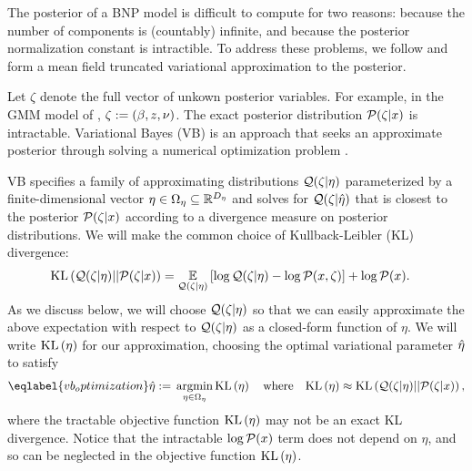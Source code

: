 The posterior of a BNP model is difficult to compute for two reasons: because
the number of components is (countably) infinite, and because the posterior
normalization constant is intractible.  To address these problems, we follow
\citet{blei:2006:vi_for_dp} and form a mean field truncated variational
approximation to the posterior.

Let $\zeta$ denote the full vector of unkown posterior variables. For example,
in the GMM model of , $\zeta := (\beta, z, \nu)$.  The
exact posterior distribution $\mathcal{P}(\zeta \vert x)$ is intractable. Variational
Bayes (VB) is an approach that seeks an approximate posterior through solving a
numerical optimization problem \citep{jordan:1999:vi,
wainwright:2008:graphical_models, blei:2017:vi_review}.

VB specifies a family of approximating distributions $\mathcal{Q}(\zeta \vert \eta)$
parameterized by a finite-dimensional vector $\eta \in \Omega_{\eta} \subseteq
\mathbb{R}^{{D_{\eta}}}$ and solves for $\mathcal{Q}(\zeta\vert\hat\eta)$ that is closest to
the posterior $\mathcal{P}(\zeta \vert x)$ according to a divergence measure on
posterior distributions. We will make the common choice of Kullback-Leibler (KL)
divergence:
%
\begin{align*}
%
\KL{\q(\zeta \vert \eta) || \p(\zeta \vert \x)}
={}&    \expect{\q(\zeta \vert \eta)}{
        \log \q(\zeta \vert \eta) - \logp(\x, \zeta)} + \logp(\x). \nonumber
%
\end{align*}
%
As we discuss below, we will choose $\mathcal{Q}(\zeta \vert \eta)$ so that we can easily
approximate the above expectation with respect to $\mathcal{Q}(\zeta \vert \eta)$ as a
closed-form function of $\eta$.  We will write $\mathrm{KL}\left(\eta\right)$ for our
approximation, choosing the optimal variational parameter $\hat\eta$ to satisfy
%
\begin{align}\eqlabel{vb_optimization}
%
\etaopt :={} \argmin_{\eta \in \etadom} \KL{\eta} \mathwhere
\KL{\eta} \approx{} \KL{\q(\zeta \vert \eta) || \p(\zeta \vert \x)},
%
\end{align}
%
where the tractable objective function $\mathrm{KL}\left(\eta\right)$ may not be an exact KL
divergence. Notice that the intractable $\log \mathcal{P}(x)$ term does not depend on
$\eta$, and so can be neglected in the objective function $\mathrm{KL}\left(\eta\right)$.

